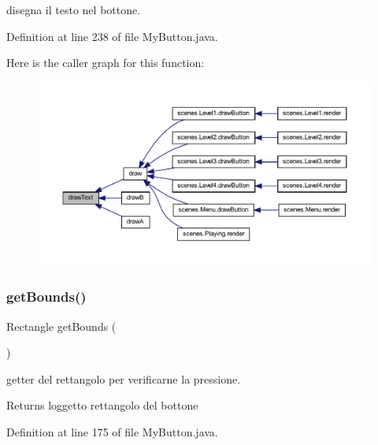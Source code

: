 disegna il testo nel bottone. 



Definition at line 238 of file My\+Button.\+java.

Here is the caller graph for this function\+:\nopagebreak
\begin{figure}[H]
\begin{center}
\leavevmode
\includegraphics[width=350pt]{classui_1_1_my_button_a8df311009317d839a01870ceac76eb75_icgraph}
\end{center}
\end{figure}
\mbox{\label{classui_1_1_my_button_a187945475e730bfa340a10f63224e91f}} 
\subsubsection{\texorpdfstring{get\+Bounds()}{getBounds()}}
{\footnotesize\ttfamily Rectangle get\+Bounds (\begin{DoxyParamCaption}{ }\end{DoxyParamCaption})}



getter del rettangolo per verificarne la pressione. 

\begin{DoxyReturn}{Returns}
l\textquotesingle{}oggetto rettangolo del bottone 
\end{DoxyReturn}


Definition at line 175 of file My\+Button.\+java.

